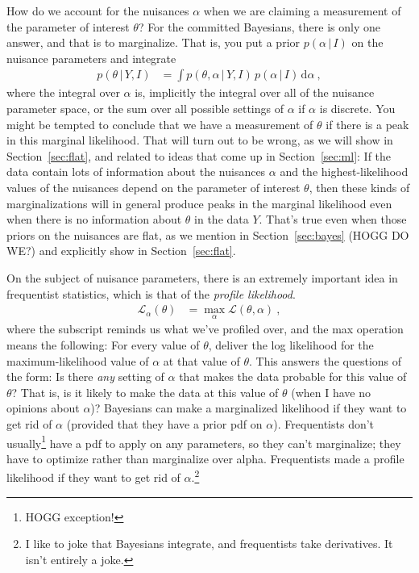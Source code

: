 \documentclass{article}
\newcommand{\sectionname}{Section}
\newcommand{\secref}[1]{\sectionname~\ref{#1}}
\newcommand{\dd}{\mathrm{d}}
\newcommand{\given}{\,|\,}
\begin{document}
How do we account for the nuisances $\alpha$ when we are claiming a measurement of the parameter of interest $\theta$?
For the committed Bayesians, there is only one answer, and that is to marginalize.
That is, you put a prior $p(\alpha\given I)$ on the nuisance parameters and integrate
\begin{align}
    p(\theta\given Y,I) &= \int p(\theta,\alpha\given Y,I)\,p(\alpha\given I)\,\dd\alpha ~,\label{eq:marginallf}
\end{align}
where the integral over $\alpha$ is, implicitly the integral over all of the nuisance parameter space, or the sum over all possible settings of $\alpha$ if $\alpha$ is discrete.
You might be tempted to conclude that we have a measurement of $\theta$ if there is a peak in this marginal likelihood.
That will turn out to be wrong, as we will show in \secref{sec:flat}, and related to ideas that come up in \secref{sec:ml}:
If the data contain lots of information about the nuisances $\alpha$ and the highest-likelihood values of the nuisances depend on the parameter of interest $\theta$, then these kinds of marginalizations will in general produce peaks in the marginal likelihood even when there is no information about $\theta$ in the data $Y$.
That's true even when those priors on the nuisances are flat, as we mention in \secref{sec:bayes} (HOGG DO WE?) and explicitly show in \secref{sec:flat}.

On the subject of nuisance parameters,
there is an extremely important idea in frequentist statistics, which is that of the \emph{profile likelihood}.
\begin{align}
    \mathscr{L}_\alpha(\theta) &= \max_\alpha \mathscr{L}(\theta,\alpha) ~,
\end{align}
where the subscript reminds us what we've profiled over, and the max operation means the following:
For every value of $\theta$, deliver the log likelihood for the maximum-likelihood value of $\alpha$ at that value of $\theta$.
This answers the questions of the form:
Is there \emph{any} setting of $\alpha$ that makes the data probable for this value of $\theta$?
That is, is it likely to make the data at this value of $\theta$ (when I have no opinions about $\alpha$)?
Bayesians can make a marginalized likelihood if they want to get rid of $\alpha$ (provided that they have a prior pdf on $\alpha$).
Frequentists don't usually\footnote{%
HOGG exception!}
have a pdf to apply on any parameters, so they can't marginalize; they have to optimize rather than marginalize over alpha.
Frequentists made a profile likelihood if they want to get rid of $\alpha$.\footnote{%
I like to joke that Bayesians integrate, and frequentists take derivatives. It isn't entirely a joke.}
\end{document}
